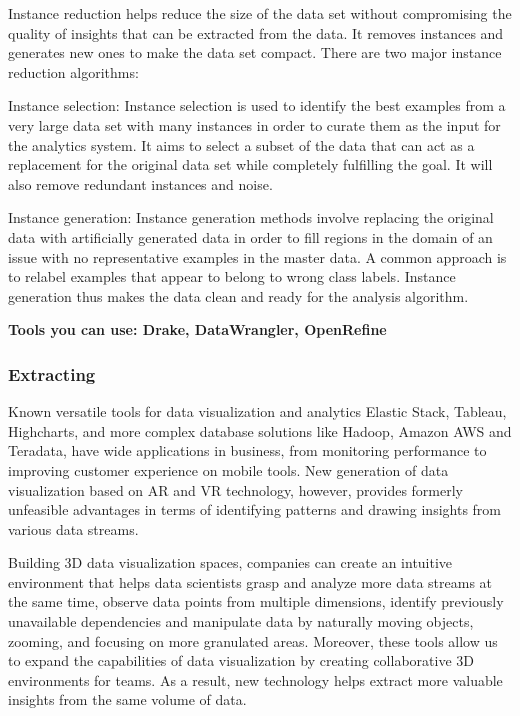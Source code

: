 \documentclass[]{book}
\theoremstyle{definition}
\theoremstyle{definition}
\theoremstyle{definition}
\theoremstyle{remark}
\begin{document}
Instance reduction helps reduce the size of the data set without
compromising the quality of insights that can be extracted from the
data. It removes instances and generates new ones to make the data set
compact. There are two major instance reduction algorithms:

Instance selection: Instance selection is used to identify the best
examples from a very large data set with many instances in order to
curate them as the input for the analytics system. It aims to select a
subset of the data that can act as a replacement for the original data
set while completely fulfilling the goal. It will also remove redundant
instances and noise.

Instance generation: Instance generation methods involve replacing the
original data with artificially generated data in order to fill regions
in the domain of an issue with no representative examples in the master
data. A common approach is to relabel examples that appear to belong to
wrong class labels. Instance generation thus makes the data clean and
ready for the analysis algorithm.

\textbf{Tools you can use: Drake, DataWrangler, OpenRefine}

\subsubsection{Extracting}\label{extracting}

Known versatile tools for data visualization and analytics Elastic
Stack, Tableau, Highcharts, and more complex database solutions like
Hadoop, Amazon AWS and Teradata, have wide applications in business,
from monitoring performance to improving customer experience on mobile
tools. New generation of data visualization based on AR and VR
technology, however, provides formerly unfeasible advantages in terms of
identifying patterns and drawing insights from various data streams.

Building 3D data visualization spaces, companies can create an intuitive
environment that helps data scientists grasp and analyze more data
streams at the same time, observe data points from multiple dimensions,
identify previously unavailable dependencies and manipulate data by
naturally moving objects, zooming, and focusing on more granulated
areas. Moreover, these tools allow us to expand the capabilities of data
visualization by creating collaborative 3D environments for teams. As a
result, new technology helps extract more valuable insights from the
same volume of data.
\end{document}
